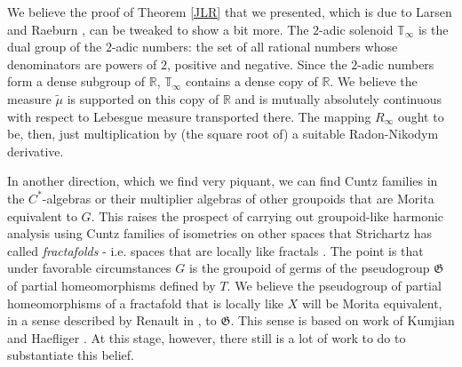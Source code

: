 \documentclass{amsproc}
\theoremstyle{plain}
\theoremstyle{definition}
\theoremstyle{definition}
\theoremstyle{remark}
\theoremstyle{plain}
\begin{document}
We believe the proof of Theorem \ref{JLR} that we presented, which
is due to Larsen and Raeburn \cite{LR06}, can be tweaked to show
a bit more. The $2$-adic solenoid $\mathbb{T}_{\infty}$ is the dual
group of the $2$-adic numbers: the set of all rational numbers whose
denominators are powers of $2$, positive and negative. Since the
$2$-adic numbers form a dense subgroup of $\mathbb{R}$, $\mathbb{T}_{\infty}$
contains a dense copy of $\mathbb{R}$. We believe the measure $\tilde{\mu}$
is supported on this copy of $\mathbb{R}$ and is mutually absolutely
continuous with respect to Lebesgue measure transported there. The
mapping $R_{\infty}$ ought to be, then, just multiplication by (the
square root of) a suitable Radon-Nikodym derivative. 

In another direction, which we find very piquant, we can find Cuntz
families in the $C^{*}$-algebras or their multiplier algebras of
other groupoids that are Morita equivalent to $G$. This raises the
prospect of carrying out groupoid-like harmonic analysis using Cuntz
families of isometries on other spaces that Strichartz has called
\emph{fractafolds} - i.e. spaces that are locally like fractals \cite{rS03}.
The point is that under favorable circumstances $G$ is the groupoid
of germs of the pseudogroup $\mathfrak{G}$ of partial homeomorphisms
defined by $T$. We believe the pseudogroup of partial homeomorphisms
of a fractafold that is locally like $X$ will be Morita equivalent,
in a sense described by Renault in \cite[Section 3]{jR00}, to $\mathfrak{G}$.
This sense is based on work of Kumjian \cite{aK84} and Haefliger
\cite{aH85}. At this stage, however, there still is a lot of work
to do to substantiate this belief.
\end{document}
